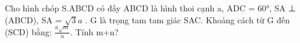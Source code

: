 \begin{question}[type=short_answer,difficulty=3,code={III-1}]
Cho hình chóp S.ABCD có đấy ABCD là hình thoi cạnh a, ADC = 60°, SA ⊥ (ABCD), SA = $ \sqrt{3}a $
. G là trọng tam tam giác SAC. Khoảng cách từ G đến (SCD) bằng: $ \frac{a\sqrt{m}}{n} $. Tính m+n?


\end{question}